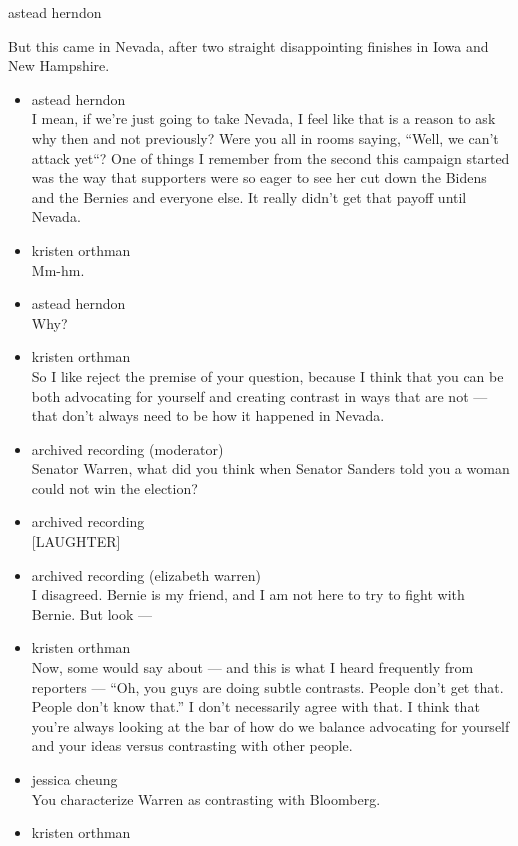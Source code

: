 astead herndon

But this came in Nevada, after two straight disappointing finishes in
Iowa and New Hampshire.

\begin{itemize}
\item
  astead herndon\\
  I mean, if we're just going to take Nevada, I feel like that is a
  reason to ask why then and not previously? Were you all in rooms
  saying, ``Well, we can't attack yet``? One of things I remember from
  the second this campaign started was the way that supporters were so
  eager to see her cut down the Bidens and the Bernies and everyone
  else. It really didn't get that payoff until Nevada.
\item
  kristen orthman\\
  Mm-hm.
\item
  astead herndon\\
  Why?
\item
  kristen orthman\\
  So I like reject the premise of your question, because I think that
  you can be both advocating for yourself and creating contrast in ways
  that are not --- that don't always need to be how it happened in
  Nevada.
\item
  archived recording (moderator)\\
  Senator Warren, what did you think when Senator Sanders told you a
  woman could not win the election?
\item
  archived recording\\
  {[}LAUGHTER{]}
\item
  archived recording (elizabeth warren)\\
  I disagreed. Bernie is my friend, and I am not here to try to fight
  with Bernie. But look ---
\item
  kristen orthman\\
  Now, some would say about --- and this is what I heard frequently from
  reporters --- ``Oh, you guys are doing subtle contrasts. People don't
  get that. People don't know that.'' I don't necessarily agree with
  that. I think that you're always looking at the bar of how do we
  balance advocating for yourself and your ideas versus contrasting with
  other people.
\item
  jessica cheung\\
  You characterize Warren as contrasting with Bloomberg.
\item
  kristen orthman\\

\end{itemize}

